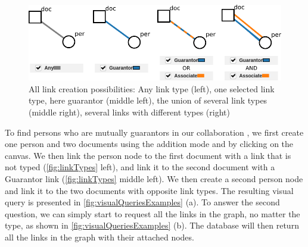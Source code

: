 \begin{figure}[!ht]
    \centering
    \includegraphics[width=0.9\linewidth]{static/figures/ComBiNet/OriginalPaperFigures/CGF/links.pdf}
    \caption{All link creation possibilities: Any link type (left), one selected link type, here guarantor (middle left), the union of several link types (middle right), several links with different types (right)}\label{fig:linkTypes}
\end{figure}

To find persons who are mutually guarantors in our collaboration \pascal, we first create one person and two documents using the addition mode and by clicking on the canvas.
We then link the person node to the first document with a link that is not typed (\autoref{fig:linkTypes} left), and link it to the second document with a Guarantor link (\autoref{fig:linkTypes} middle left).
We then create a second person node and link it to the two documents with opposite link types.
The resulting visual query is presented in \autoref{fig:visualQueriesExamples} (a).
To answer the second question, we can simply start to request all the links in the graph, no matter the type, as shown in \autoref{fig:visualQueriesExamples} (b).
The database will then return all the links in the graph with their attached nodes.



